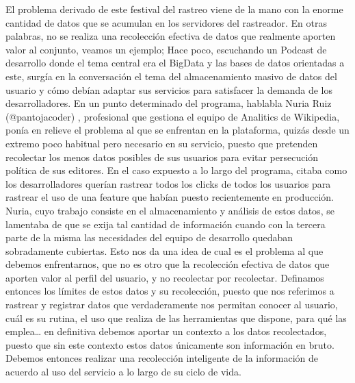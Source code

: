 \documentclass[12pt,a4paper,oneside]{book} %
\begin{document}
\newline \newline
El problema derivado de este festival del rastreo viene de la mano con la enorme cantidad de datos que se acumulan en los servidores del rastreador. En otras palabras, no se realiza una recolección efectiva de datos que realmente aporten valor al conjunto, veamos un ejemplo; 
\newline \newline
Hace poco, escuchando un Podcast de desarrollo \cite{codeontherocks} donde el tema central era el BigData y las bases de datos orientadas a este, surgía en la conversación el tema del almacenamiento masivo de datos del usuario y cómo debían adaptar sus servicios para satisfacer la demanda de los desarrolladores. En un punto determinado del programa, hablabla Nuria Ruiz (@pantojacoder) \cite{pantojacoder}, profesional que gestiona el equipo de Analitics de Wikipedia, ponía en relieve el problema al que se enfrentan en la plataforma, quizás desde un extremo poco habitual pero necesario en su servicio, puesto que pretenden recolectar los menos datos posibles de sus usuarios para evitar persecución política de sus editores. En el caso expuesto a lo largo del programa, citaba como los desarrolladores querían rastrear todos los clicks de todos los usuarios para rastrear el uso de una feature que habían puesto recientemente en producción. 
\newline \newline
Nuria, cuyo trabajo consiste en el almacenamiento y análisis de estos datos, se lamentaba de que se exija tal cantidad de información cuando con la tercera parte de la misma las necesidades del equipo de desarrollo quedaban sobradamente cubiertas. 
Esto nos da una idea de cual es el problema al que debemos enfrentarnos, que no es otro que la recolección efectiva de datos que aporten valor al perfil del usuario, y no recolectar por recolectar. 
\newline \newline
Definamos entonces los límites de estos datos y su recolección, puesto que nos referimos a rastrear y registrar datos que verdaderamente nos permitan conocer al usuario, cuál es su rutina, el uso que realiza de las herramientas que dispone, para qué las emplea… en definitiva debemos aportar un contexto a los datos recolectados, puesto que sin este contexto estos datos únicamente son información en bruto. Debemos entonces realizar una recolección inteligente de la información de acuerdo al uso del servicio a lo largo de su ciclo de vida. 
\end{document}

